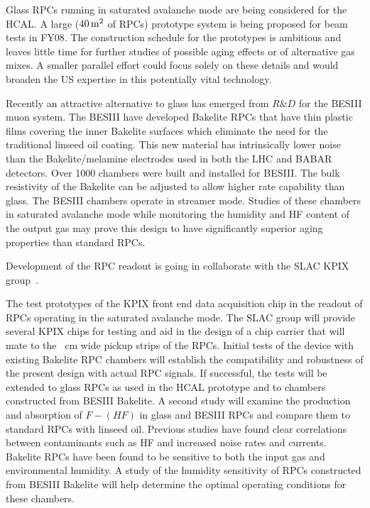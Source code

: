 Glass RPCs running in saturated avalanche mode are being considered for the HCAL. A large ($\unit[40]{m^2}$ of RPCs) prototype system is being proposed
for beam tests in FY08. The construction schedule for the prototypes is ambitious and leaves little time for further studies of possible aging effects or of alternative gas mixes. A smaller parallel effort could focus solely on these details and would broaden the US expertise in this potentially vital technology.

Recently an attractive alternative to glass has emerged from $R\&D$ for the BESIII muon system. The BESIII have developed Bakelite RPCs that have thin plastic films covering the inner Bakelite surfaces which eliminate the need for the traditional linseed oil coating. This new material has intrinsically lower noise than the Bakelite/melamine electrodes used in both the LHC and BABAR detectors. Over 1000 chambers were built and installed for BESIII. The bulk resistivity of the Bakelite can be adjusted to allow higher rate capability than glass. The BESIII chambers operate in streamer mode. Studies of these chambers in saturated avalanche mode while monitoring the humidity and HF content of the output gas may prove this design to have significantly superior aging properties than standard RPCs.

Development of the RPC readout is going in collaborate with the SLAC KPIX group~\cite{}.

The test prototypes of the KPIX front end data acquisition chip in the readout of RPCs operating in the saturated avalanche mode. The SLAC group will provide several KPIX chips for testing and aid in the design of a chip carrier that will mate to the ~\unit[3]{cm} wide pickup strips of the RPCs. Initial tests of the device with existing Bakelite RPC chambers will establish the compatibility and robustness of the present design with actual RPC signals. If successful, the tests will be extended to glass RPCs as used in the HCAL prototype and to chambers constructed from BESIII Bakelite.
A second study will examine the production and absorption of $F-(HF)$ in glass and BESIII RPCs and compare them to standard RPCs with linseed oil. Previous studies have found clear correlations between contaminants such as HF and increased noise rates and currents. Bakelite RPCs have been found to be sensitive to both the input gas and environmental humidity. A study of the humidity sensitivity of RPCs constructed from BESIII Bakelite will help determine the optimal operating conditions for these chambers.

